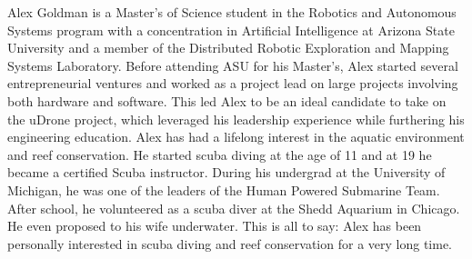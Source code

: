 
Alex Goldman is a Master's of Science student in the Robotics and Autonomous Systems program with a concentration in Artificial Intelligence at Arizona State University and a member of the Distributed Robotic Exploration and Mapping Systems Laboratory. Before attending ASU for his Master's, Alex started several entrepreneurial ventures and worked as a project lead on large projects involving both hardware and software. This led Alex to be an ideal candidate to take on the uDrone project, which leveraged his leadership experience while furthering his engineering education. Alex has had a lifelong interest in the aquatic environment and reef conservation. He started scuba diving at the age of 11 and at 19 he became a certified Scuba instructor. During his undergrad at the University of Michigan, he was one of the leaders of the Human Powered Submarine Team. After school, he volunteered as a scuba diver at the Shedd Aquarium in Chicago. He even proposed to his wife underwater. This is all to say: Alex has been personally interested in scuba diving and reef conservation for a very long time.